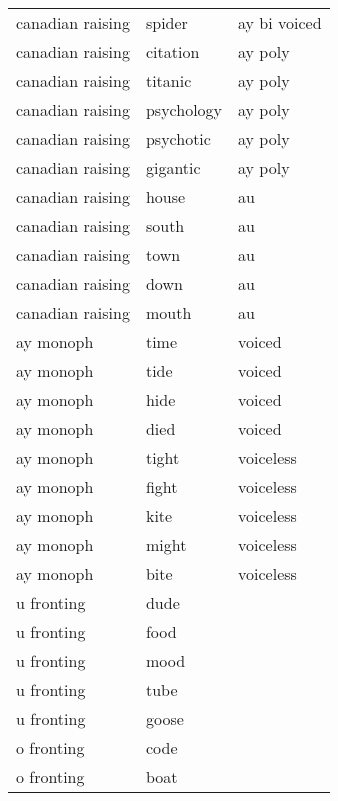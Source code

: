 \begin{longtable}{lll}
canadian raising & spider      & ay bi voiced         \\
canadian raising & citation    & ay poly              \\
canadian raising & titanic     & ay poly              \\
canadian raising & psychology  & ay poly              \\
canadian raising & psychotic   & ay poly              \\
canadian raising & gigantic    & ay poly              \\
canadian raising & house       & au                   \\
canadian raising & south       & au                   \\
canadian raising & town        & au                   \\
canadian raising & down        & au                   \\
canadian raising & mouth       & au                   \\
ay monoph        & time        & voiced               \\
ay monoph        & tide        & voiced               \\
ay monoph        & hide        & voiced               \\
ay monoph        & died        & voiced               \\
ay monoph        & tight       & voiceless            \\
ay monoph        & fight       & voiceless            \\
ay monoph        & kite        & voiceless            \\
ay monoph        & might       & voiceless            \\
ay monoph        & bite        & voiceless            \\
u fronting       & dude        &                      \\
u fronting       & food        &                      \\
u fronting       & mood        &                      \\
u fronting       & tube        &                      \\
u fronting       & goose       &                      \\
o fronting       & code        &                      \\
o fronting       & boat        &                      \\

\end{longtable}
